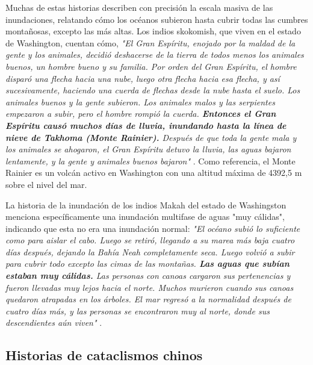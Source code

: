 \documentclass[10pt,twocolumn,letterpaper]{article}
\begin{document}
Muchas de estas historias describen con precisión la escala masiva de las inundaciones, relatando cómo los océanos subieron hasta cubrir todas las cumbres montañosas, excepto las más altas. Los indios skokomish, que viven en el estado de Washington, cuentan cómo, \textit{"El Gran Espíritu, enojado por la maldad de la gente y los animales, decidió deshacerse de la tierra de todos menos los animales buenos, un hombre bueno y su familia. Por orden del Gran Espíritu, el hombre disparó una flecha hacia una nube, luego otra flecha hacia esa flecha, y así sucesivamente, haciendo una cuerda de flechas desde la nube hasta el suelo. Los animales buenos y la gente subieron. Los animales malos y las serpientes empezaron a subir, pero el hombre rompió la cuerda. \textbf{Entonces el Gran Espíritu causó muchos días de lluvia, inundando hasta la línea de nieve de Takhoma (Monte Rainier).} Después de que toda la gente mala y los animales se ahogaron, el Gran Espíritu detuvo la lluvia, las aguas bajaron lentamente, y la gente y animales buenos bajaron"} \cite{3}. Como referencia, el Monte Rainier es un volcán activo en Washington con una altitud máxima de 4392,5 m sobre el nivel del mar.

La historia de la inundación de los indios Makah del estado de Washingston menciona específicamente una inundación multifase de aguas "muy cálidas", indicando que esta no era una inundación normal: \textit{"El océano subió lo suficiente como para aislar el cabo. Luego se retiró, llegando a su marea más baja cuatro días después, dejando la Bahía Neah completamente seca. Luego volvió a subir para cubrir todo excepto las cimas de las montañas. \textbf{Las aguas que subían estaban muy cálidas.} Las personas con canoas cargaron sus pertenencias y fueron llevadas muy lejos hacia el norte. Muchos murieron cuando sus canoas quedaron atrapadas en los árboles. El mar regresó a la normalidad después de cuatro días más, y las personas se encontraron muy al norte, donde sus descendientes aún viven"} \cite{3}.

\subsection{Historias de cataclismos chinos}
\end{document}
